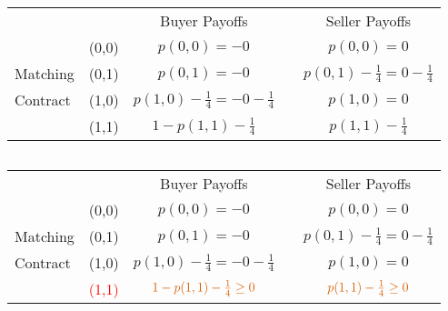 \documentclass[12pt,letterpaper]{article}           %
\begin{document}
$ $

\newpage


\begin{table}[]
	\begin{tabular}{lcccc}
		&                            & Buyer Payoffs         &                       & Seller Payoffs        \\ \cline{3-3} \cline{5-5} 
		& \multicolumn{1}{c|}{(0,0)} & \multicolumn{1}{c|}{$p(0,0)= -0$} & \multicolumn{1}{c|}{} & \multicolumn{1}{c|}{$p(0,0)=  0$} \\ \cline{3-3} \cline{5-5} 
		Matching & \multicolumn{1}{c|}{(0,1)} & \multicolumn{1}{c|}{$p(0,1)= -0$} & \multicolumn{1}{c|}{} & \multicolumn{1}{c|}{$p(0,1) -\frac{1}{4}= 0 -\frac{1}{4}$}  \\ \cline{3-3} \cline{5-5} 
		Contract& \multicolumn{1}{c|}{(1,0)} & \multicolumn{1}{c|}{$ p(1,0) - \frac{1}{4}= - 0 - \frac{1}{4}$} & \multicolumn{1}{c|}{} & \multicolumn{1}{c|}{$p(1,0)=  0$} \\ \cline{3-3} \cline{5-5} 
		& \multicolumn{1}{c|}{(1,1)} & \multicolumn{1}{c|}{$ 1-p(1,1) - \frac{1}{4}$} & \multicolumn{1}{c|}{} & \multicolumn{1}{c|}{$ p(1,1)- \frac{1}{4}$} \\ \cline{3-3} \cline{5-5} 
	\end{tabular}
\end{table}

$ $

\newpage


\begin{table}[]
	\begin{tabular}{lcccc}
		&                            & Buyer Payoffs         &                       & Seller Payoffs        \\ \cline{3-3} \cline{5-5} 
& \multicolumn{1}{c|}{(0,0)} & \multicolumn{1}{c|}{$p(0,0)= -0$} & \multicolumn{1}{c|}{} & \multicolumn{1}{c|}{$p(0,0)=  0$} \\ \cline{3-3} \cline{5-5} 
Matching & \multicolumn{1}{c|}{(0,1)} & \multicolumn{1}{c|}{$p(0,1)= -0$} & \multicolumn{1}{c|}{} & \multicolumn{1}{c|}{$p(0,1) -\frac{1}{4}= 0 -\frac{1}{4}$}  \\ \cline{3-3} \cline{5-5} 
Contract& \multicolumn{1}{c|}{(1,0)} & \multicolumn{1}{c|}{$ p(1,0) - \frac{1}{4}= - 0 - \frac{1}{4}$} & \multicolumn{1}{c|}{} & \multicolumn{1}{c|}{$p(1,0)=  0$} \\ \cline{3-3} \cline{5-5} 
		& \multicolumn{1}{c|}{\textcolor{red}{(1,1)}} & \multicolumn{1}{c|}{$ \textcolor{red}{1 - p(1,1) - \frac{1}{4}\geq0}$} & \multicolumn{1}{c|}{} & \multicolumn{1}{c|}{$\textcolor{red}{p(1,1) - \frac{1}{4}\geq 0}$} \\ \cline{3-3} \cline{5-5} 
	\end{tabular}
\end{table}
\end{document}
